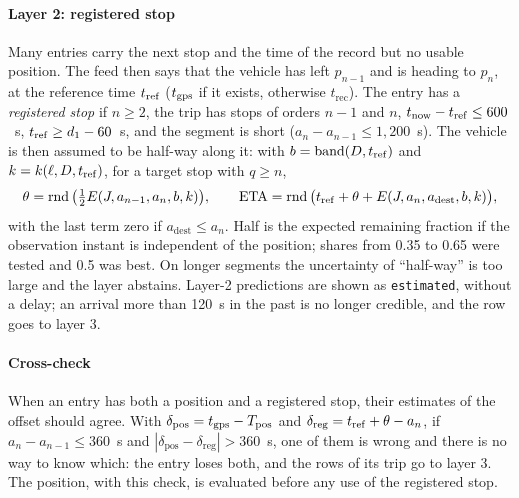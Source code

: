 \paragraph{Layer 2: registered stop} Many entries carry the next stop and the time of the record but no usable
position. The feed then says that the vehicle has left $p_{n-1}$ and is heading to $p_n$, at the reference time
$t_{\mathrm{ref}}$ ($t_{\mathrm{gps}}$ if it exists, otherwise $t_{\mathrm{rec}}$). The entry has a \emph{registered stop} if $n\ge2$, the
trip has stops of orders $n-1$ and $n$, $t_{\mathrm{now}}-t_{\mathrm{ref}}\le600$~s, $t_{\mathrm{ref}}\ge d_1-60$~s, and the segment is
short ($a_n-a_{n-1}\le1{,}200$~s). The vehicle is then assumed to be half-way along it: with $b=\operatorname{band}(D,t_{\mathrm{ref}})$ and
$k=k(\ell,D,t_{\mathrm{ref}})$, for a target stop with $q\ge n$,
\begin{equation}
\theta=\operatorname{rnd}\big(\tfrac12E(J,a_{n-1},a_n,b,k)\big),\qquad
\mathrm{ETA}=\operatorname{rnd}\big(t_{\mathrm{ref}}+\theta+E(J,a_n,a_{\mathrm{dest}},b,k)\big),
\label{eq:layer2}
\end{equation}
with the last term zero if $a_{\mathrm{dest}}\le a_n$. Half is the expected remaining fraction if the observation
instant is independent of the position; shares from 0.35 to 0.65 were tested and 0.5 was best. On longer segments the
uncertainty of ``half-way'' is too large and the layer abstains. Layer-2 predictions are shown as \texttt{estimated},
without a delay; an arrival more than 120~s in the past is no longer credible, and the row goes to layer 3.

\paragraph{Cross-check} When an entry has both a position and a registered stop, their estimates of the offset should
agree. With $\delta_{\mathrm{pos}}=t_{\mathrm{gps}}-T_{\mathrm{pos}}$ and $\delta_{\mathrm{reg}}=t_{\mathrm{ref}}+\theta-a_n$, if
$a_n-a_{n-1}\le360$~s and $|\delta_{\mathrm{pos}}-\delta_{\mathrm{reg}}|>360$~s, one of them is wrong and there is no
way to know which: the entry loses both, and the rows of its trip go to layer 3. The position, with this check, is
evaluated before any use of the registered stop.

